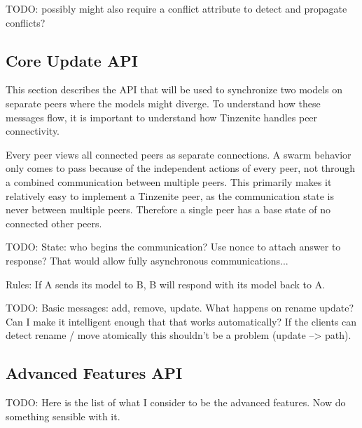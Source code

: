 TODO: possibly might also require a conflict attribute to detect and propagate conflicts?

\subsection{Core Update API}

This section describes the API that will be used to synchronize two models on separate peers where the models might diverge.
To understand how these messages flow, it is important to understand how Tinzenite handles peer connectivity.

Every peer views all connected peers as separate connections.
A swarm behavior only comes to pass because of the independent actions of every peer, not through a combined communication between multiple peers.
This primarily makes it relatively easy to implement a Tinzenite peer, as the communication state is never between multiple peers.
Therefore a single peer has a base state of no connected other peers.

TODO: State: who begins the communication?
Use nonce to attach answer to response?
That would allow fully asynchronous communications...

Rules: If A sends its model to B, B will respond with its model back to A.

TODO: Basic messages: add, remove, update.
What happens on rename update?
Can I make it intelligent enough that that works automatically?
If the clients can detect rename / move atomically this shouldn't be a problem (update --> path).

\subsection{Advanced Features API}

TODO: Here is the list of what I consider to be the advanced features.
Now do something sensible with it.

